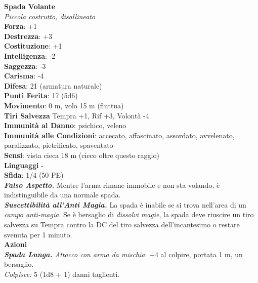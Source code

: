 \begin{multicols}{2}
\medskip\textbf{Spada Volante}\\
\emph{Piccola costrutto, disallineato}\\
\textbf{Forza}: +1\\
\textbf{Destrezza}: +3\\
\textbf{Costituzione}: +1\\
\textbf{Intelligenza}: -2\\
\textbf{Saggezza}: -3\\
\textbf{Carisma}: -4\\
\textbf{Difesa}: 21 (armatura naturale)\\
\textbf{Punti Ferita}: 17 (5d6)\\
\textbf{Movimento}: 0 m, volo 15 m (fluttua)\\
\textbf{Tiri Salvezza}  Tempra +1, Rif +3, Volontà -4\\
\textbf{Immunità al Danno}: psichico, veleno\\
\textbf{Immunità alle Condizioni}: accecato, affascinato, assordato, avvelenato, paralizzato, pietrificato, spaventato\\
\textbf{Sensi}: vista cieca 18 m (cieco oltre questo raggio)\\
\textbf{Linguaggi} -\\
\textbf{Sfida}: 1/4 (50 PE)\smallskip\\
\emph{\textbf{Falso Aspetto.}} Mentre l'arma rimane immobile e non sta volando, è indistinguibile da una normale spada.\\
\emph{\textbf{Suscettibilità all'Anti Magia.}} La spada è inabile se si trova nell'area di un \emph{campo anti-magia}. Se è bersaglio di \emph{dissolvi} \emph{magie}, la spada deve riuscire un tiro salvezza su Tempra contro la DC del tiro salvezza dell'incantesimo o restare svenuta per 1 minuto.\\
\smallskip\textbf{Azioni}\\
\emph{\textbf{Spada Lunga.} Attacco con arma da mischia}: +4 al colpire, portata 1 m, un bersaglio.\\
\emph{Colpisce:} 5 (1d8 + 1) danni taglienti.\\


\end{multicols}

